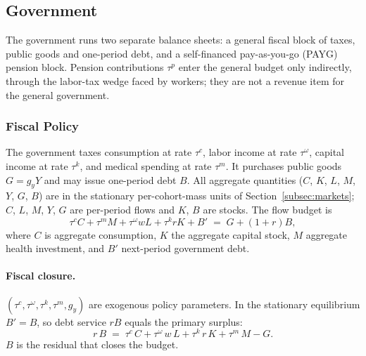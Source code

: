 \documentclass[12pt,a4paper]{article}
\begin{document}
\subsection{Government}
\label{subsec:government}

The government runs two separate balance sheets: a general fiscal block of taxes, public goods and one-period debt, and a self-financed pay-as-you-go (PAYG) pension block. Pension contributions $\tau^p$ enter the general budget only indirectly, through the labor-tax wedge faced by workers; they are not a revenue item for the general government.

\subsubsection{Fiscal Policy}
\label{subsubsec:fiscal}
The government taxes consumption at rate $\tau^c$, labor income at rate $\tau^\omega$, capital income at rate $\tau^k$, and medical spending at rate $\tau^m$. It purchases public goods $G = g_y Y$ and may issue one-period debt $B$. All aggregate quantities ($C$, $K$, $L$, $M$, $Y$, $G$, $B$) are in the stationary per-cohort-mass units of Section~\ref{subsec:markets}; $C$, $L$, $M$, $Y$, $G$ are per-period flows and $K$, $B$ are stocks. The flow budget is
\begin{equation}
\label{eq:gov_budget}
\tau^c C + \tau^m M + \tau^\omega w L + \tau^k r K + B' \;=\; G + (1+r)B,
\end{equation}
where $C$ is aggregate consumption, $K$ the aggregate capital stock, $M$ aggregate health investment, and $B'$ next-period government debt.

\paragraph{Fiscal closure.}
$(\tau^c, \tau^\omega, \tau^k, \tau^m, g_y)$ are exogenous policy parameters. In the stationary equilibrium $B' = B$, so debt service $rB$ equals the primary surplus:
\begin{equation}
\label{eq:gov_stationary}
r\, B \;=\; \tau^c\, C + \tau^\omega\, w\, L + \tau^k\, r\, K + \tau^m\, M - G.
\end{equation}
$B$ is the residual that closes the budget.
\end{document}
